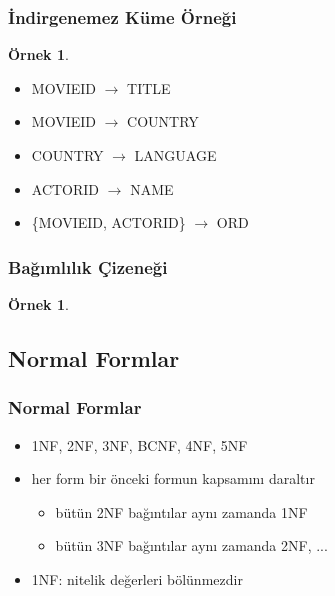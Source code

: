 \documentclass[dvipsnames]{beamer}
\theoremstyle{definition}
\theoremstyle{example}
\newtheorem{ornek}[theorem]{Örnek}
\theoremstyle{plain}
\begin{document}
\begin{frame}
  \frametitle{İndirgenemez Küme Örneği}

  \begin{ornek}
    \begin{itemize}
      \item MOVIEID $\rightarrow$ TITLE
      \item MOVIEID $\rightarrow$ COUNTRY
      \item COUNTRY $\rightarrow$ LANGUAGE
      \item ACTORID $\rightarrow$ NAME
      \item \{MOVIEID, ACTORID\} $\rightarrow$ ORD
    \end{itemize}
  \end{ornek}
\end{frame}

\begin{frame}
  \frametitle{Bağımlılık Çizeneği}

  \begin{ornek}
    \begin{center}
    \end{center}
  \end{ornek}
\end{frame}

\subsection{Normal Formlar}

\begin{frame}
  \frametitle{Normal Formlar}

  \begin{itemize}
    \item 1NF, 2NF, 3NF, BCNF, 4NF, 5NF

    \item her form bir önceki formun kapsamını daraltır
    \begin{itemize}
      \item bütün 2NF bağıntılar aynı zamanda 1NF
      \item bütün 3NF bağıntılar aynı zamanda 2NF, ...
    \end{itemize}

    \pause
    \medskip
    \item 1NF: nitelik değerleri bölünmezdir
  \end{itemize}
\end{frame}
\end{document}

